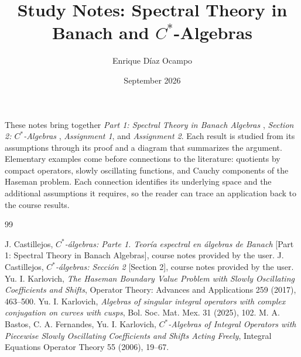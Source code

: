 \documentclass{notes}
\title{Study Notes: Spectral Theory in Banach and $C^*$-Algebras}
\author{Enrique Díaz Ocampo}
\date{September 2026}
\begin{document}
\maketitle
\tableofcontents

\begin{context}
These notes bring together \emph{Part 1: Spectral Theory in Banach Algebras}
\cite{CastillejosParte1}, \emph{Section 2: $C^*$-Algebras}
\cite{CastillejosCap2}, \emph{Assignment 1}, and \emph{Assignment 2}. Each result is studied
from its assumptions through its proof and a diagram that summarizes the argument.
Elementary examples come before connections to the literature: quotients by compact
operators, slowly oscillating functions, and Cauchy components of the Haseman problem.
Each connection identifies its underlying space and the additional assumptions it
requires, so the reader can trace an application back to the course results.
\end{context}










\renewcommand{\bibname}{Working References}
\begin{thebibliography}{99}
 J. Castillejos, \emph{$C^*$-álgebras: Parte 1. Teoría espectral en álgebras de Banach} [Part 1: Spectral Theory in Banach Algebras], course notes provided by the user.
 J. Castillejos, \emph{$C^*$-álgebras: Sección 2} [Section 2], course notes provided by the user.
 Yu. I. Karlovich, \emph{The Haseman Boundary Value Problem with Slowly Oscillating Coefficients and Shifts}, Operator Theory: Advances and Applications 259 (2017), 463--500.
 Yu. I. Karlovich, \emph{Algebras of singular integral operators with complex conjugation on curves with cusps}, Bol. Soc. Mat. Mex. 31 (2025), 102.
 M. A. Bastos, C. A. Fernandes, Yu. I. Karlovich, \emph{$C^*$-Algebras of Integral Operators with Piecewise Slowly Oscillating Coefficients and Shifts Acting Freely}, Integral Equations Operator Theory 55 (2006), 19--67.
\end{thebibliography}
\end{document}
